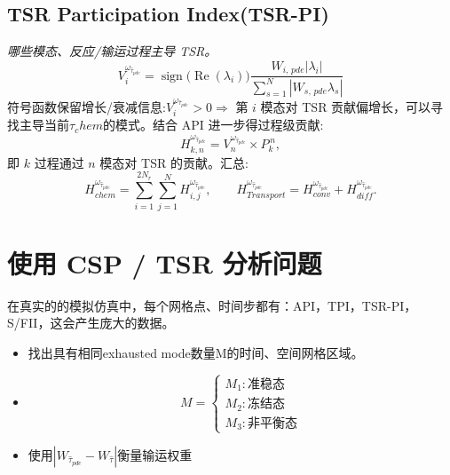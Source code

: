 \documentclass[11pt,a4paper]{article}
\DeclareMathOperator{\Real}{Re}
\DeclareMathOperator{\sign}{sign}
\begin{document}
\subsection{TSR Participation Index(TSR-PI)}

\emph{哪些模态、反应/输运过程主导 TSR。}
\begin{equation}
\boxed{\;V^{\omega_{\hat\tau_{pde}}}_{i}=\sign\bigl(\Real(\lambda_i)\bigr)\frac{W_{i,\,pde}|\lambda_i|}{\sum_{s=1}^{N}|W_{s,\,pde}\lambda_s|}\;}
\end{equation}
符号函数保留增长/衰减信息:$V^{\omega_{\hat\tau_{pde}}}_{i}>0\Rightarrow$ 第 $i$ 模态对 TSR 贡献偏增长，可以寻找主导当前$\tau_chem$的模式。结合 API 进一步得过程级贡献:
\begin{equation}
H^{\omega_{\hat\tau_{pde}}}_{k,n}=V^{\omega_{\hat\tau_{pde}}}_{n}\times P^{\,n}_{k},
\end{equation}
即 $k$ 过程通过 $n$ 模态对 TSR 的贡献。汇总:
\[
H^{\omega_{\hat\tau_{pde}}}_{chem}=\sum_{i=1}^{2N_r}\sum_{j=1}^{N}H^{\omega_{\hat\tau_{pde}}}_{i,j},
\qquad
H^{\omega_{\hat\tau_{pde}}}_{Transport}=H^{\omega_{\hat\tau_{pde}}}_{conv}+H^{\omega_{\hat\tau_{pde}}}_{diff}.
\]


\section{使用 CSP / TSR 分析问题}

在真实的的模拟仿真中，每个网格点、时间步都有：API，TPI，TSR-PI，S/FII，这会产生庞大的数据。
\begin{itemize}[leftmargin=2em]
	\item 找出具有相同exhausted mode数量M的时间、空间网格区域。
	\item 	\[ M=\begin{cases} M_1: \text{准稳态}\\ M_2:  \text{冻结态}\\ M_3: \text{非平衡态}\end{cases}
	\]
	\item 使用$|W_{\hat\tau_{pde}}-W_{\hat\tau}|$衡量输运权重
\end{itemize}

\appendix
\end{document}
